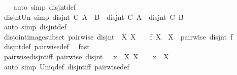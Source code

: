 \begin{isabellebody}
%
\isadelimproof
\ \ %
\endisadelimproof
%
\isatagproof
{}\isamarkupfalse%
\ {\isacharparenleft}{\kern0pt}auto\ simp{\isacharcolon}{\kern0pt}\ disjnt{\isacharunderscore}{\kern0pt}def{\isacharparenright}{\kern0pt}%
\endisatagproof
{\isafoldproof}%
%
\isadelimproof
\isanewline
%
\endisadelimproof
\isanewline
{}\isamarkupfalse%
\ disjnt{\isacharunderscore}{\kern0pt}Un{}\ {\isacharbrackleft}{\kern0pt}simp{\isacharbrackright}{\kern0pt}{\isacharcolon}{\kern0pt}\ {\isachardoublequoteopen}disjnt\ C\ {\isacharparenleft}{\kern0pt}A\ {\isasymunion}\ B{\isacharparenright}{\kern0pt}\ {\isasymlongleftrightarrow}\ disjnt\ C\ A\ {\isasymand}\ disjnt\ C\ B{\isachardoublequoteclose}\isanewline
%
\isadelimproof
\ \ %
\endisadelimproof
%
\isatagproof
{}\isamarkupfalse%
\ {\isacharparenleft}{\kern0pt}auto\ simp{\isacharcolon}{\kern0pt}\ disjnt{\isacharunderscore}{\kern0pt}def{\isacharparenright}{\kern0pt}%
\endisatagproof
{\isafoldproof}%
%
\isadelimproof
\isanewline
%
\endisadelimproof
\isanewline
{}\isamarkupfalse%
\ disjoint{\isacharunderscore}{\kern0pt}image{\isacharunderscore}{\kern0pt}subset{\isacharcolon}{\kern0pt}\ {\isachardoublequoteopen}{\isasymlbrakk}pairwise\ disjnt\ {\isasymA}{\isacharsemicolon}{\kern0pt}\ {\isasymAnd}X{\isachardot}{\kern0pt}\ X\ {\isasymin}\ {\isasymA}\ {\isasymLongrightarrow}\ f\ X\ {\isasymsubseteq}\ X{\isasymrbrakk}\ {\isasymLongrightarrow}\ pairwise\ disjnt\ {\isacharparenleft}{\kern0pt}f\ {\isacharbackquote}{\kern0pt}{\isasymA}{\isacharparenright}{\kern0pt}{\isachardoublequoteclose}\isanewline
%
\isadelimproof
\ \ %
\endisadelimproof
%
\isatagproof
{}\isamarkupfalse%
\ disjnt{\isacharunderscore}{\kern0pt}def\ pairwise{\isacharunderscore}{\kern0pt}def\ \isamarkupfalse%
\ fast%
\endisatagproof
{\isafoldproof}%
%
\isadelimproof
\isanewline
%
\endisadelimproof
\isanewline
{}\isamarkupfalse%
\ pairwise{\isacharunderscore}{\kern0pt}disjnt{\isacharunderscore}{\kern0pt}iff{\isacharcolon}{\kern0pt}\ {\isachardoublequoteopen}pairwise\ disjnt\ {\isasymA}\ {\isasymlongleftrightarrow}\ {\isacharparenleft}{\kern0pt}{\isasymforall}x{\isachardot}{\kern0pt}\ {\isasymexists}\isactrlsub {\isasymle}\ X{\isachardot}{\kern0pt}\ X\ {\isasymin}\ {\isasymA}\ {\isasymand}\ x\ {\isasymin}\ X{\isacharparenright}{\kern0pt}{\isachardoublequoteclose}\isanewline
%
\isadelimproof
\ \ %
\endisadelimproof
%
\isatagproof
{}\isamarkupfalse%
\ {\isacharparenleft}{\kern0pt}auto\ simp{\isacharcolon}{\kern0pt}\ Uniq{\isacharunderscore}{\kern0pt}def\ disjnt{\isacharunderscore}{\kern0pt}iff\ pairwise{\isacharunderscore}{\kern0pt}def{\isacharparenright}{\kern0pt}%

\end{isabellebody}
